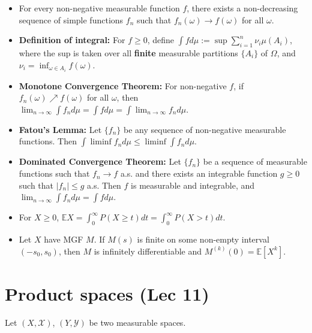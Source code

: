 \documentclass[twoside]{article}
\newcommand{\dis}{\displaystyle}
\newcommand\bbE{\mathbb{E}}
\newcommand\calX{\mathcal{X}}
\newcommand\calY{\mathcal{Y}}
\newcommand\om{\omega}
\newcommand\Om{\Omega}
\begin{document}
\begin{itemize}
\item For every non-negative measurable function $f$, there exists a non-decreasing sequence of simple functions $f_n$ such that $f_n(\om) \rightarrow f(\om)$ for all $\om$.

\item \textbf{Definition of integral:} For $f \geq 0$, define $\dis\int f d\mu := \sup \dis\sum_{i=1}^n \nu_i \mu(A_i)$, where the sup is taken over all \textbf{finite} measurable partitions $\{A_i\}$ of $\Om$, and $\nu_i = \inf_{\om \in A_i} f(\om)$.

\item \textbf{Monotone Convergence Theorem:} For non-negative $f$, if $f_n(\om) \nearrow f(\om)$ for all $\om$, then $\dis\lim_{n \rightarrow \infty} \int f_n d\mu = \int f d \mu = \int \lim_{n \rightarrow \infty} f_n d\mu$.

\item \textbf{Fatou's Lemma:} Let $\{ f_n \}$ be any sequence of non-negative measurable functions. Then $\dis\int \liminf f_n d\mu \leq \liminf \int f_n d\mu$.

\item \textbf{Dominated Convergence Theorem:} Let $\{ f_n \}$ be a sequence of measurable functions such that $f_n \rightarrow f$ a.s. and there exists an integrable function $g \geq 0$ such that $| f_n | \leq g$ a.s. Then $f$ is measurable and integrable, and $\dis\lim_{n \rightarrow \infty} \int f_n d\mu = \int f d\mu$.

\item For $X \geq 0$, $\bbE X = \dis\int_0^\infty P(X \geq t) dt = \dis\int_0^\infty P(X > t)dt$.

\item Let $X$ have MGF $M$. If $M(s)$ is finite on some non-empty interval $(-s_0, s_0)$, then $M$ is infinitely differentiable and $M^{(k)}(0) = \bbE [X^k]$.

\end{itemize}

\section*{Product spaces (Lec 11)}
Let $(X, \calX)$, $(Y, \calY)$ be two measurable spaces.
\end{document}
